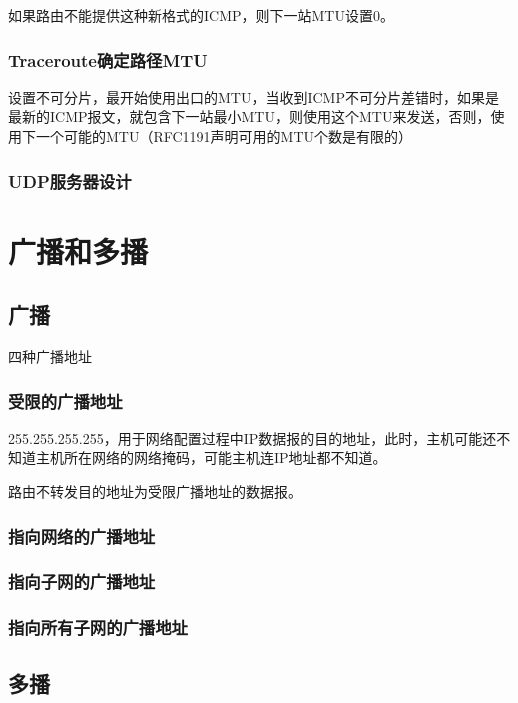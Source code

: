 如果路由不能提供这种新格式的ICMP，则下一站MTU设置0。

\subsubsection{Traceroute确定路径MTU}

设置不可分片，最开始使用出口的MTU，当收到ICMP不可分片差错时，如果是最新的ICMP报文，就包含下一站最小MTU，则使用这个MTU来发送，否则，使用下一个可能的MTU（RFC1191声明可用的MTU个数是有限的）

\subsubsection{UDP服务器设计}



\section{广播和多播}

\subsection{广播}

四种广播地址

\subsubsection{受限的广播地址}

255.255.255.255，用于网络配置过程中IP数据报的目的地址，此时，主机可能还不知道主机所在网络的网络掩码，可能主机连IP地址都不知道。

路由不转发目的地址为受限广播地址的数据报。

\subsubsection{指向网络的广播地址}

\subsubsection{指向子网的广播地址}

\subsubsection{指向所有子网的广播地址}

\subsection{多播}



